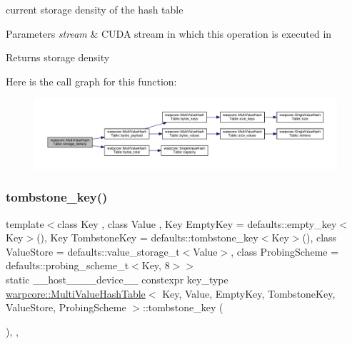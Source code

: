 current storage density of the hash table 


\begin{DoxyParams}{Parameters}
{\em stream} & C\+U\+DA stream in which this operation is executed in \\
\hline
\end{DoxyParams}
\begin{DoxyReturn}{Returns}
storage density 
\end{DoxyReturn}
Here is the call graph for this function\+:
\nopagebreak
\begin{figure}[H]
\begin{center}
\leavevmode
\includegraphics[width=350pt]{classwarpcore_1_1MultiValueHashTable_ab8731334f269b625d8fea853f81c05b4_cgraph}
\end{center}
\end{figure}
\mbox{\label{classwarpcore_1_1MultiValueHashTable_a6174c9b15d8772c8fa1874b6415e9937}} 
\subsubsection{\texorpdfstring{tombstone\+\_\+key()}{tombstone\_key()}}
{\footnotesize\ttfamily template$<$class Key , class Value , Key Empty\+Key = defaults\+::empty\+\_\+key$<$\+Key$>$(), Key Tombstone\+Key = defaults\+::tombstone\+\_\+key$<$\+Key$>$(), class Value\+Store  = defaults\+::value\+\_\+storage\+\_\+t$<$\+Value$>$, class Probing\+Scheme  = defaults\+::probing\+\_\+scheme\+\_\+t$<$\+Key, 8$>$$>$ \\
static \+\_\+\+\_\+host\+\_\+\+\_\+\+\_\+\+\_\+device\+\_\+\+\_\+ constexpr key\+\_\+type \hyperlink{classwarpcore_1_1MultiValueHashTable}{warpcore\+::\+Multi\+Value\+Hash\+Table}$<$ Key, Value, Empty\+Key, Tombstone\+Key, Value\+Store, Probing\+Scheme $>$\+::tombstone\+\_\+key (\begin{DoxyParamCaption}{ }\end{DoxyParamCaption})\hspace{0.3cm}{\ttfamily [inline]}, {\ttfamily [static]}, {\ttfamily [noexcept]}}



